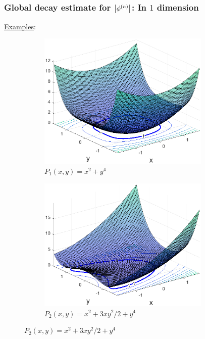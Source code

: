 \documentclass{beamer}
\theoremstyle{definition}
\begin{document}
\begin{frame}
\frametitle{Global decay estimate for $\abs{\phi^{(n)}}$: In $1$ dimension}

\underline{Examples}:
\begin{figure}
	\centering
	\begin{subfigure}{0.49\textwidth}
		\centering
		\includegraphics[width=0.9\textwidth]{Fig1a.eps}
		\caption{$P_1(x,y) = x^2+ y^4$}
	\end{subfigure}%
	\hspace{-30pt}
	\begin{subfigure}{0.49\textwidth}
		\centering
		\includegraphics[width=0.9\textwidth]{Fig1c.eps}
		\caption{$P_2(x,y) = x^2 + 3xy^2/2 + y^4$}
	\end{subfigure}
\end{figure}
\end{frame}
\end{document}
